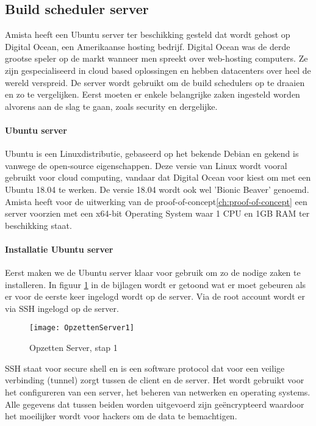         \subsection{Build scheduler server}
        \label{subsec:build-scheduler-server}
        Amista heeft een Ubuntu server ter beschikking gesteld dat wordt gehost op Digital Ocean, een Amerikaanse hosting bedrijf. Digital Ocean was de derde grootse speler op de markt wanneer men spreekt over web-hosting computers. Ze zijn gespecialiseerd in cloud based oplossingen en hebben datacenters over heel de wereld verspreid. De server wordt gebruikt om de build schedulers op te draaien en zo te vergelijken. Eerst moeten er enkele belangrijke zaken ingesteld worden alvorens aan de slag te gaan, zoals security en dergelijke.
            
            \paragraph{Ubuntu server}
            Ubuntu is een Linuxdistributie, gebaseerd op het bekende Debian en gekend is vanwege de open-source eigenschappen.
            Deze versie van Linux wordt vooral gebruikt voor cloud computing, vandaar dat Digital Ocean voor kiest om met een Ubuntu 18.04 te werken.
            De versie 18.04 wordt ook wel 'Bionic Beaver' genoemd.
            Amista heeft voor de uitwerking van de proof-of-concept\ref{ch:proof-of-concept} een server voorzien met een x64-bit Operating System waar 1 CPU en 1GB RAM ter beschikking staat.
            
            \paragraph{Installatie Ubuntu server}
            Eerst maken we de Ubuntu server klaar voor gebruik om zo de nodige zaken te installeren.
            In figuur \ref{OpzettenServer1} in de bijlagen wordt er getoond wat er moet gebeuren als er voor de eerste keer ingelogd wordt op de server.
            Via de root account wordt er via SSH ingelogd op de server. 
            
            \begin{figure}
                \centering
                \texttt{[image: OpzettenServer1]}
                \caption{Opzetten Server, stap 1} \label{OpzettenServer1}
            \end{figure}
            
            SSH staat voor secure shell en is een software protocol dat voor een veilige verbinding (tunnel) zorgt tussen de client en de server. Het wordt gebruikt voor het configureren van een server, het beheren van netwerken en operating systems. Alle gegevens dat tussen beiden worden uitgevoerd zijn geëncrypteerd waardoor het moeilijker wordt voor hackers om de data te bemachtigen.
            
